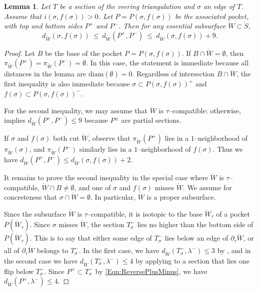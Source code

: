 \documentclass[11pt,letterpaper]{amsart}
\newcommand{\diam}{\mathrm{diam}}
\newcommand{\mr}{\mathring}
\newcommand{\psub}{\mr W}
\numberwithin{equation}{section}
\newtheorem{lemma}[theorem]{Lemma}
\theoremstyle{definition}
\begin{document}
\begin{lemma}
\label{Lem:ClosestSecSubsurfaceDist}
Let $T$ be a section of the veering triangulation and $\sigma$ an edge of $T$. 
Assume that $i(\sigma, f(\sigma)) > 0$. Let $P = P(\sigma, f(\sigma))$ be the associated pocket, with top and bottom sides $P^+$ and $P^-$.
Then
for any essential subsurface $\psub \subset \mr S$,
\[
d_{\psub}(\sigma , f(\sigma)) \: \leq \: d_{\psub}(P^+, P^-) \: \leq \:  d_{\psub}(\sigma , f(\sigma)) + 9.
\]
\end{lemma}

\begin{proof}
Let $B$ be the base of the pocket $P = P(\sigma, f(\sigma))$. If $B \cap \psub = \emptyset$, then $\pi_{\psub}(P^+) = \pi_{\psub}(P^-) = \emptyset$. In this case,
 the statement is immediate because all distances in the lemma are $\diam(\emptyset) = 0$. Regardless of intersection $B \cap \psub$, the first inequality is also immediate because $\sigma \subset P(\sigma, f(\sigma))^+$ and $f(\sigma) \subset P(\sigma, f(\sigma))^-$. 


For the second inequality, we may assume that  $\psub$ is $\tau$--compatible: otherwise, 
 implies $d_{\psub}(P^+, P^-) \leq 9$ because  $P^\pm$ are partial sections.

If $\sigma$ and $f(\sigma)$ both cut $\psub$, observe that $\pi_{\psub}(P^+)$ lies in a $1$--neighborhood of  $\pi_{\psub}(\sigma)$, and $\pi_{\psub}(P^-)$ similarly lies in a $1$--neighborhood of $f(\sigma)$. Thus we have $d_{\psub}(P^+, P^-) \leq d_{\psub}(\sigma , f(\sigma)) + 2$.

It remains to prove the second inequality in the special case where $\psub$ is $\tau$--compatible, $\psub \cap B \neq \emptyset$, and one of $\sigma$ and $f(\sigma)$ misses $\psub$. We assume for concreteness that $\sigma \cap \psub = \emptyset$. In particular, $\mr W$ is a proper subsurface.

Since the subsurface $\psub$ is $\tau$--compatible, it is isotopic to the base $\psub_\tau$ of a pocket $P(\psub_\tau)$. Since $\sigma$ misses $\psub$, the section $T^-_\sigma$ lies no higher than the bottom side of $P(\psub_\tau)$. 
This is to say that either some edge of $T^-_\sigma$ lies below an edge of $\partial_\tau \psub$, or all of $\partial_\tau \psub$ belongs to $T^-_\sigma$. In the first case, we have $d_{\psub} (T^-_\sigma, \lambda^-) \leq 3$ by , and in the second case we have $d_{\psub} (T^-_\sigma, \lambda^-) \leq 4$ by applying  to a section that lies one flip below $T^-_\sigma$. 
Since $P^+ \subset T^-_\sigma$ by \eqref{Eqn:ReversePlusMinus},
we have $d_{\psub} (P^+, \lambda^-) \leq 4$.


\end{proof}
\end{document}
